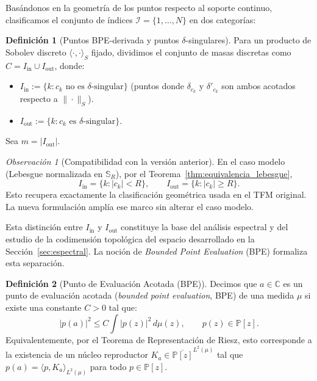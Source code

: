 \documentclass[12pt,a4paper]{article}
\theoremstyle{definition}
\newtheorem{definition}{Definición}
\theoremstyle{remark}
\newtheorem{remark}{Observación}
\newcommand{\C}{\mathbb{C}}
\newcommand{\Poly}{\mathbb{P}[z]}
\newcommand{\abs}[1]{\left| #1 \right|}
\begin{document}
Basándonos en la geometría de los puntos respecto al soporte continuo, clasificamos el conjunto de índices $\mathcal{I} = \{1, \dots, N\}$ en dos categorías:

\begin{definition}[Puntos BPE-derivada y puntos $\delta$-singulares]\label{def:class_points_new}
  Para un producto de Sobolev discreto $\langle\cdot,\cdot\rangle_S$
  fijado, dividimos el conjunto de masas discretas como
  $C=I_{\mathrm{in}}\cup I_{\mathrm{out}}$, donde:
  \begin{itemize}
    \item $I_{\mathrm{in}}:=\{k:c_k\text{ no es }\delta\text{-singular}\}$
          (puntos donde $\delta_{c_k}$ y $\delta'_{c_k}$ son ambos acotados
          respecto a $\|\cdot\|_S$).
    \item $I_{\mathrm{out}}:=\{k:c_k\text{ es }\delta\text{-singular}\}$.
  \end{itemize}
  Sea $m=|I_{\mathrm{out}}|$.
\end{definition}

\begin{remark}[Compatibilidad con la versión anterior]\label{rem:compatibilidad_class_points}
  En el caso modelo (Lebesgue normalizada en $\mathbb{S}_R$), por el
  Teorema~\ref{thm:equivalencia_lebesgue},
  \[
    I_{\mathrm{in}}=\{k:|c_k|<R\},\qquad I_{\mathrm{out}}=\{k:|c_k|\ge R\}.
  \]
  Esto recupera exactamente la clasificación geométrica usada en el TFM
  original. La nueva formulación amplía ese marco sin alterar el caso modelo.
\end{remark}

Esta distinción entre $I_{\mathrm{in}}$ y $I_{\mathrm{out}}$ constituye la base del análisis espectral y del estudio de la codimensión topológica del espacio desarrollado en la Sección~\ref{sec:espectral}. La noción de \textit{Bounded Point Evaluation} (BPE) formaliza esta separación.

\begin{definition}[Punto de Evaluación Acotada (BPE)]
  Decimos que $a \in \C$ es un punto de evaluación acotada (\textit{bounded point evaluation}, BPE) de una medida $\mu$ \cite{miller1999bounded,aleman2009nontangential} si existe una constante $C > 0$ tal que:
  \begin{equation}
    \abs{p(a)}^2 \leq C \int \abs{p(z)}^2 \, d\mu(z), \qquad p(z) \in \Poly.
  \end{equation}
  Equivalentemente, por el Teorema de Representación de Riesz, esto corresponde a la existencia de un núcleo reproductor $K_a \in \overline{\Poly}^{L^2(\mu)}$ tal que $p(a) = \langle p, K_a \rangle_{L^2(\mu)}$ para todo $p \in \Poly$.
\end{definition}
\end{document}

